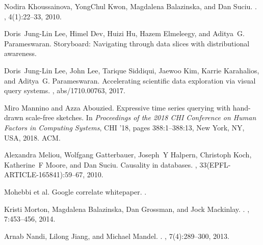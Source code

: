 \documentclass[11pt]{article}
\begin{document}
{\begin{thebibliography}{}
Nodira Khoussainova, YongChul Kwon, Magdalena Balazinska, and Dan Suciu.
.
, 4(1):22--33, 2010.

Doris~Jung{-}Lin Lee, Himel Dev, Huizi Hu, Hazem Elmeleegy, and Aditya~G.
  Parameswaran.
\newblock Storyboard: Navigating through data slices with distributional
  awareness.

Doris~Jung{-}Lin Lee, John Lee, Tarique Siddiqui, Jaewoo Kim, Karrie
  Karahalios, and Aditya~G. Parameswaran.
\newblock Accelerating scientific data exploration via visual query systems.
, abs/1710.00763, 2017.

Miro Mannino and Azza Abouzied.
\newblock Expressive time series querying with hand-drawn scale-free sketches.
\newblock In {\em Proceedings of the 2018 CHI Conference on Human Factors in
  Computing Systems}, CHI '18, pages 388:1--388:13, New York, NY, USA, 2018.
  ACM.

Alexandra Meliou, Wolfgang Gatterbauer, Joseph~Y Halpern, Christoph Koch,
  Katherine~F Moore, and Dan Suciu.
\newblock Causality in databases.
, 33(EPFL-ARTICLE-165841):59--67,
  2010.

{Mohebbi et al.}
\newblock Google correlate whitepaper.
.

Kristi Morton, Magdalena Balazinska, Dan Grossman, and Jock Mackinlay.
.
, 7:453--456, 2014.

Arnab Nandi, Lilong Jiang, and Michael Mandel.
.
, 7(4):289--300, 2013.


\end{thebibliography}}
\end{document}
